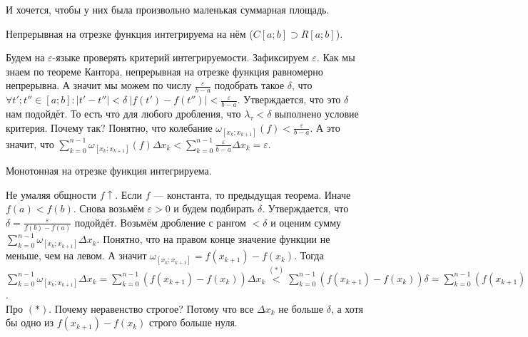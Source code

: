 \documentclass{article}
\begin{document}
\begin{itemize}
\begin{Comment}
\begin{center}
            \end{center}
            И хочется, чтобы у них была произвольно маленькая суммарная площадь.
        \end{Comment}
        \thm Непрерывная на отрезке функция интегрируема на нём ($C[a;b]\supset R[a;b]$).
        \begin{Proof}
            Будем на $\varepsilon$-языке проверять критерий интегрируемости. Зафиксируем $\varepsilon$. Как мы знаем по теореме Кантора, непрерывная на отрезке функция равномерно непрерывна. А значит мы можем по числу $\frac\varepsilon{b-a}$ подобрать такое $\delta$, что $\forall t';t''\in[a;b]:|t'-t''|<\delta~|f(t')-f(t'')|<\frac\varepsilon{b-a}$. Утверждается, что это $\delta$ нам подойдёт. То есть что для любого дробления, что $\lambda_\tau<\delta$ выполнено условие критерия. Почему так? Понятно, что колебание $\omega_{[x_k;x_{k+1}]}(f)<\frac\varepsilon{b-a}$. А это значит, что $\sum\limits_{k=0}^{n-1}\omega_{[x_k;x_{k+1}]}(f)\Delta x_k<\sum\limits_{k=0}^{n-1}\frac\varepsilon{b-a}\Delta x_k=\varepsilon$.
        \end{Proof}
        \thm Монотонная на отрезке функция интегрируема.
        \begin{Proof}
            Не умаляя общности $f\uparrow$. Если $f$ --- константа, то предыдущая теорема. Иначе $f(a)<f(b)$. Снова возьмём $\varepsilon>0$ и будем подбирать $\delta$. Утверждается, что $\delta=\frac\varepsilon{f(b)-f(a)}$ подойдёт. Возьмём дробление с рангом $<\delta$ и оценим сумму $\sum\limits_{k=0}^{n-1}\omega_{[x_k;x_{k+1}]}\Delta x_k$. Понятно, что на правом конце значение функции не меньше, чем на левом. А значит $\omega_{[x_k;x_{k+1}]}=f(x_{k+1})-f(x_k)$. Тогда $\sum\limits_{k=0}^{n-1}\omega_{[x_k;x_{k+1}]}\Delta x_k=\sum\limits_{k=0}^{n-1}(f(x_{k+1})-f(x_k))\Delta x_k\overset{(*)}<\sum\limits_{k=0}^{n-1}(f(x_{k+1})-f(x_k))\delta=\sum\limits_{k=0}^{n-1}(f(x_{k+1})-f(x_k))\frac\varepsilon{f(b)-f(a)}=\varepsilon$.\\
            Про $(*)$. Почему неравенство строгое? Потому что все $\Delta x_k$ не больше $\delta$, а хотя бы одно из $f(x_{k+1})-f(x_k)$ строго больше нуля.

\end{Proof}
\end{itemize}
\end{document}
